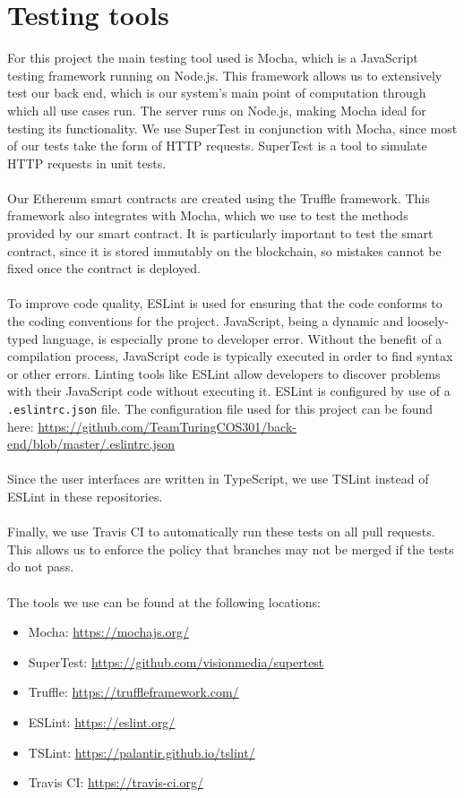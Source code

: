 \documentclass{article}
\begin{document}
\section{Testing tools}
For this project the main testing tool used is Mocha, which is a JavaScript testing framework running on Node.js. This framework allows us to extensively test our back end, which is our system's main point of computation through which all use cases run. The server runs on Node.js, making Mocha ideal for testing its functionality. We use SuperTest in conjunction with Mocha, since most of our tests take the form of HTTP requests. SuperTest is a tool to simulate HTTP requests in unit tests.
\\\\
Our Ethereum smart contracts are created using the Truffle framework. This framework also integrates with Mocha, which we use to test the methods provided by our smart contract. It is particularly important to test the smart contract, since it is stored immutably on the blockchain, so mistakes cannot be fixed once the contract is deployed.
\\\\
To improve code quality, ESLint is used for ensuring that the code conforms to the coding conventions for the project. JavaScript, being a dynamic and loosely-typed language, is especially prone to developer error. Without the benefit of a compilation process, JavaScript code is typically executed in order to find syntax or other errors. Linting tools like ESLint allow developers to discover problems with their JavaScript code without executing it. ESLint is configured by use of a \texttt{.eslintrc.json} file. The configuration file used for this project can be found here: \url{https://github.com/TeamTuringCOS301/back-end/blob/master/.eslintrc.json}
\\\\
Since the user interfaces are written in TypeScript, we use TSLint instead of ESLint in these repositories.
\\\\
Finally, we use Travis CI to automatically run these tests on all pull requests. This allows us to enforce the policy that branches may not be merged if the tests do not pass.
\\\\
The tools we use can be found at the following locations:
\begin{itemize}
\item Mocha: \url{https://mochajs.org/}
\item SuperTest: \url{https://github.com/visionmedia/supertest}
\item Truffle: \url{https://truffleframework.com/}
\item ESLint: \url{https://eslint.org/}
\item TSLint: \url{https://palantir.github.io/tslint/}
\item Travis CI: \url{https://travis-ci.org/}
\end{itemize}
\end{document}
